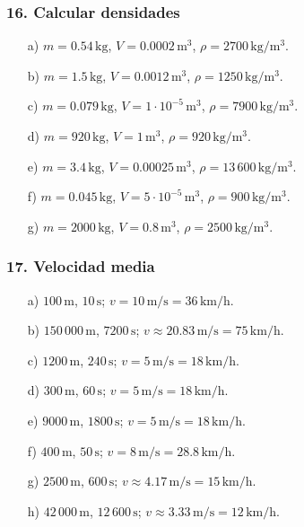 \subsubsection*{16. Calcular densidades}
\begin{enumerate}
    \item[a)] $m=0.54\,\mathrm{kg}$,
    $V=0.0002\,\mathrm{m^3}$,
    $\rho=2700\,\mathrm{kg/m^3}$.

    \item[b)] $m=1.5\,\mathrm{kg}$,
    $V=0.0012\,\mathrm{m^3}$,
    $\rho=1250\,\mathrm{kg/m^3}$.

    \item[c)] $m=0.079\,\mathrm{kg}$,
    $V=1\cdot10^{-5}\,\mathrm{m^3}$,
    $\rho=7900\,\mathrm{kg/m^3}$.

    \item[d)] $m=920\,\mathrm{kg}$,
    $V=1\,\mathrm{m^3}$,
    $\rho=920\,\mathrm{kg/m^3}$.

    \item[e)] $m=3.4\,\mathrm{kg}$,
    $V=0.00025\,\mathrm{m^3}$,
    $\rho=13\,600\,\mathrm{kg/m^3}$.

    \item[f)] $m=0.045\,\mathrm{kg}$,
    $V=5\cdot10^{-5}\,\mathrm{m^3}$,
    $\rho=900\,\mathrm{kg/m^3}$.

    \item[g)] $m=2000\,\mathrm{kg}$,
    $V=0.8\,\mathrm{m^3}$,
    $\rho=2500\,\mathrm{kg/m^3}$.
\end{enumerate}

\subsubsection*{17. Velocidad media}
\begin{enumerate}
    \item[a)] $100\,\mathrm{m}$, $10\,\mathrm{s}$;
    $v=10\,\mathrm{m/s}=36\,\mathrm{km/h}$.

    \item[b)] $150\,000\,\mathrm{m}$, $7200\,\mathrm{s}$;
    $v\approx20.83\,\mathrm{m/s}=75\,\mathrm{km/h}$.

    \item[c)] $1200\,\mathrm{m}$, $240\,\mathrm{s}$;
    $v=5\,\mathrm{m/s}=18\,\mathrm{km/h}$.

    \item[d)] $300\,\mathrm{m}$, $60\,\mathrm{s}$;
    $v=5\,\mathrm{m/s}=18\,\mathrm{km/h}$.

    \item[e)] $9000\,\mathrm{m}$, $1800\,\mathrm{s}$;
    $v=5\,\mathrm{m/s}=18\,\mathrm{km/h}$.

    \item[f)] $400\,\mathrm{m}$, $50\,\mathrm{s}$;
    $v=8\,\mathrm{m/s}=28.8\,\mathrm{km/h}$.

    \item[g)] $2500\,\mathrm{m}$, $600\,\mathrm{s}$;
    $v\approx4.17\,\mathrm{m/s}=15\,\mathrm{km/h}$.

    \item[h)] $42\,000\,\mathrm{m}$, $12\,600\,\mathrm{s}$;
    $v\approx3.33\,\mathrm{m/s}=12\,\mathrm{km/h}$.
\end{enumerate}

